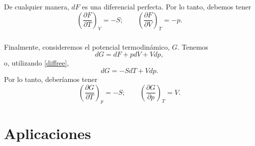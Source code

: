 \documentclass{article}
\theoremstyle{definition} \newtheorem{defi}{Definici\'on}
\theoremstyle{definition} \newtheorem{teo}{Teorema}
\theoremstyle{definition} \newtheorem{cor}{Corolario}
\begin{document}
De cualquier manera, $dF$ es una diferencial perfecta. Por lo tanto, debemos tener
\begin{equation}
\left(\frac{\partial F}{\partial T}\right)_V=-S;\qquad \left(\frac{\partial F}{\partial V}\right)_T=-p.
\end{equation}
\subparagraph{}
Finalmente, consideremos el potencial termodin\'amico, $G.$ Tenemos
\begin{equation}
dG=dF+pdV+Vdp,
\end{equation}
o, utilizando \eqref{diffree},
\begin{equation}
dG=-SdT+Vdp.
\end{equation}
Por lo tanto, deber\'iamos tener
\begin{equation}
\left(\frac{\partial G}{\partial T}\right)_p=-S;\qquad \left(\frac{\partial G}{\partial p}\right)_T=V.
\end{equation}

\section{Aplicaciones}
\end{document}
